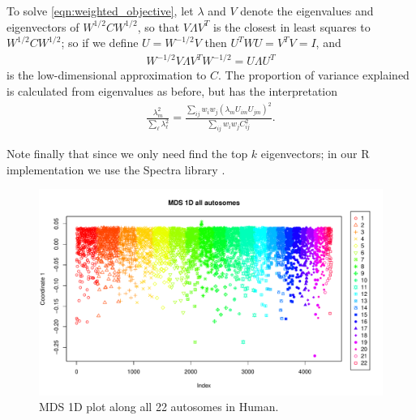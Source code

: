 \documentclass[11pt, oneside]{article}   	%
\begin{document}
To solve \eqref{eqn:weighted_objective},
let $\lambda$ and $V$ denote the eigenvalues and eigenvectors of $W^{1/2} C W^{1/2}$,
so that $V \Lambda V^T$ is the closest in least squares to $W^{1/2} C W^{1/2}$;
so if we define $U = W^{-1/2} V$
then $U^T W U = V^T V = I$,
and 
\begin{align*}
    W^{-1/2} V \Lambda V^T W^{-1/2} 
    =
    U \Lambda U^T
\end{align*}
is the low-dimensional approximation to $C$.
The proportion of variance explained is calculated from eigenvalues as before,
but has the interpretation
\begin{align*}
    \frac{ \lambda_m^2 }{ \sum_\ell \lambda_\ell^2 } 
    = 
    \frac{ \sum_{ij} w_i w_j ( \lambda_m U_{im} U_{jm} )^2 }{ \sum_{ij} w_i w_j C_{ij}^2 } .
\end{align*}

Note finally that since we only need find the top $k$ eigenvectors;
in our R implementation we use the Spectra library \citep{qiu2016rspectra}.

\begin{figure}
    \begin{center}
       \includegraphics[width=1\textwidth]{MDS_1D_win100_all_chr_col_by_chr_with_legend}
    \end{center}
    \caption{
        MDS 1D plot along all 22 autosomes in Human.
        \label{fig:mds1_along_allchr_human}
    }
\end{figure}
\end{document}
